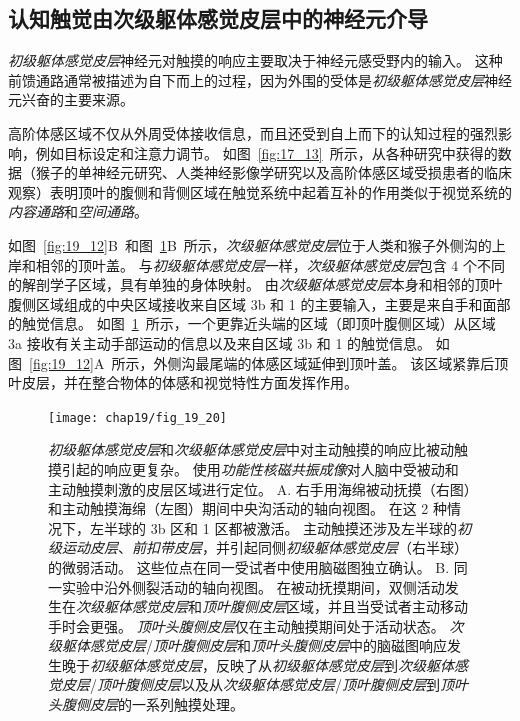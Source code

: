 \subsection{认知触觉由次级躯体感觉皮层中的神经元介导}

\textit{初级躯体感觉皮层}神经元对触摸的响应主要取决于神经元感受野内的输入。
这种前馈通路通常被描述为自下而上的过程，因为外围的受体是\textit{初级躯体感觉皮层}神经元兴奋的主要来源。


高阶体感区域不仅从外周受体接收信息，而且还受到自上而下的认知过程的强烈影响，例如目标设定和注意力调节。
如图~\ref{fig:17_13}~所示，从各种研究中获得的数据（猴子的单神经元研究、人类神经影像学研究以及高阶体感区域受损患者的临床观察）表明顶叶的腹侧和背侧区域在触觉系统中起着互补的作用类似于视觉系统的\textit{内容通路}和\textit{空间通路}。


如图~\ref{fig:19_12}B~和图~\ref{fig:19_20}B~所示，\textit{次级躯体感觉皮层}位于人类和猴子外侧沟的上岸和相邻的顶叶盖。
与\textit{初级躯体感觉皮层}一样，\textit{次级躯体感觉皮层}包含 4 个不同的解剖学子区域，具有单独的身体映射。
由\textit{次级躯体感觉皮层}本身和相邻的顶叶腹侧区域组成的中央区域接收来自区域 3b 和 1 的主要输入，主要是来自手和面部的触觉信息。
如图~\ref{fig:19_20}~所示，一个更靠近头端的区域（即顶叶腹侧区域）从区域 3a 接收有关主动手部运动的信息以及来自区域 3b 和 1 的触觉信息。
如图~\ref{fig:19_12}A~所示，外侧沟最尾端的体感区域延伸到顶叶盖。
该区域紧靠后顶叶皮层，并在整合物体的体感和视觉特性方面发挥作用。


\begin{figure}[htbp]
	\centering
	\texttt{[image: chap19/fig\_19\_20]}
	\caption{\textit{初级躯体感觉皮层}和\textit{次级躯体感觉皮层}中对主动触摸的响应比被动触摸引起的响应更复杂。
		使用\textit{功能性核磁共振成像}对人脑中受被动和主动触摸刺激的皮层区域进行定位\cite{hinkley2007sensorimotor}。
		A. 右手用海绵被动抚摸（右图）和主动触摸海绵（左图）期间中央沟活动的轴向视图。
		在这 2 种情况下，左半球的 3b 区和 1 区都被激活。
		主动触摸还涉及左半球的\textit{初级运动皮层}、\textit{前扣带皮层}，并引起同侧\textit{初级躯体感觉皮层}（右半球）的微弱活动。
		这些位点在同一受试者中使用脑磁图独立确认。
		B. 同一实验中沿外侧裂活动的轴向视图。
		在被动抚摸期间，双侧活动发生在\textit{次级躯体感觉皮层}和\textit{顶叶腹侧皮层}区域，并且当受试者主动移动手时会更强。
		\textit{顶叶头腹侧皮层}仅在主动触摸期间处于活动状态。
		\textit{次级躯体感觉皮层}/\textit{顶叶腹侧皮层}和\textit{顶叶头腹侧皮层}中的脑磁图响应发生晚于\textit{初级躯体感觉皮层}，反映了从\textit{初级躯体感觉皮层}到\textit{次级躯体感觉皮层}/\textit{顶叶腹侧皮层}以及从\textit{次级躯体感觉皮层}/\textit{顶叶腹侧皮层}到\textit{顶叶头腹侧皮层}的一系列触摸处理。}
	\label{fig:19_20}
\end{figure}


